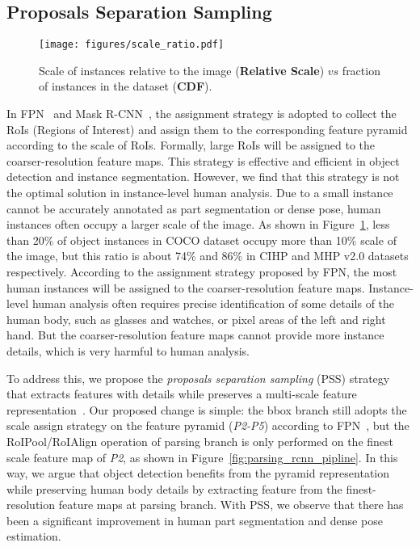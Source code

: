 \documentclass[10pt,twocolumn,letterpaper]{article}
\begin{document}
\subsection{Proposals Separation Sampling}

\begin{figure}[t]
\begin{center}
\texttt{[image: figures/scale\_ratio.pdf]}
\end{center}
\caption{Scale of instances relative to the image (\textbf{Relative Scale})  $vs$ fraction of instances in the dataset (\textbf{CDF}).}
\label{fig:scale_ratio}
\end{figure}


In FPN~\cite{Lin_cvpr2017_fpn} and Mask R-CNN~\cite{He_iccv2017_maskrcnn}, the assignment strategy is adopted to collect the RoIs (Regions of Interest) and assign them to the corresponding feature pyramid according to the scale of RoIs. Formally, large RoIs will be assigned to the coarser-resolution feature maps. This strategy is effective and efficient in object detection and instance segmentation. However, we find that this strategy is not the optimal solution in instance-level human analysis. Due to a small instance cannot be accurately annotated as part segmentation or dense pose, human instances often occupy a larger scale of the image. As shown in Figure~\ref{fig:scale_ratio}, less than 20\% of object instances in COCO dataset occupy more than 10\% scale of the image, but this ratio is about 74\% and 86\% in CIHP and MHP v2.0 datasets respectively. According to the assignment strategy proposed by FPN, the most human instances will be assigned to the coarser-resolution feature maps. Instance-level human analysis often requires precise identification of some details of the human body, such as glasses and watches, or pixel areas of the left and right hand. But the coarser-resolution feature maps cannot provide more instance details, which is very harmful to human analysis.

To address this, we propose the \emph{proposals separation sampling} (PSS) strategy that extracts features with details while preserves a multi-scale feature representation~\cite{Lin_cvpr2017_fpn, Liu_eccv2016_ssd, Li_arxiv2017_fssd}. Our proposed change is simple: the bbox branch still adopts the scale assign strategy on the feature pyramid (\emph{P2-P5}) according to FPN~\cite{Lin_cvpr2017_fpn}, but the RoIPool/RoIAlign operation of parsing branch is only performed on the finest scale feature map of \emph{P2}, as shown in Figure~\ref{fig:parsing_rcnn_pipline}. In this way, we argue that object detection benefits from the pyramid representation while preserving human body details by extracting feature from the finest-resolution feature maps at parsing branch. With PSS, we observe that there has been a significant improvement in human part segmentation and dense pose estimation.
\end{document}
